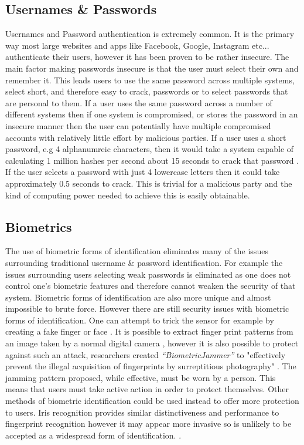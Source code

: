 \documentclass[12pt]{article}
\begin{document}
	\subsection{Usernames \& Passwords}
	Usernames and Password authentication is extremely common. It is the primary way most large websites and apps like Facebook, Google, Instagram etc... authenticate their users, however it has been proven to be rather insecure. The main factor making passwords insecure is that the user must select their own and remember it. This leads users to use the same password across multiple systems, select short, and therefore easy to crack, passwords or to select passwords that are personal to them.
	If a user uses the same password across a number of different systems then if one system is compromised, or stores the password in an insecure manner then the user can potentially have multiple compromised accounts with relatively little effort by malicious parties.
	If a user uses a short password, e.g 4 alphanumreic characters, then it would take a system capable of calculating 1 million hashes per second about 15 seconds to crack that password \citep{kessler1996passwords}. If the user selects a password with just 4 lowercase letters then it could take approximately 0.5 seconds to crack. This is trivial for a malicious party and the kind of computing power needed to achieve this is easily obtainable.
	\subsection{Biometrics}
	\label{subsect_biometrics}
	The use of biometric forms of identification eliminates many of the issues surrounding traditional username \& password identification. For example the issues surrounding users selecting weak passwords is eliminated as one does not control one's biometric features and therefore cannot weaken the security of that system. Biometric forms of identification are also more unique and almost impossible to brute force.
	However there are still security issues with biometric forms of identification. One can attempt to trick the sensor for example by creating a fake finger or face \citep{ambalakat2005security}. It is possible to extract finger print patterns from an image taken by a normal digital camera \citep{ogane2017biometric}, however it is also possible to protect against such an attack, researchers created \emph{``BiometricJammer''} to "effectively prevent the illegal acquisition of fingerprints by surreptitious photography" \citep{ogane2017biometric}. The jamming pattern proposed, while effective, must be worn by a person. This means that users must take active action in order to protect themselves. Other methods of biometric identification could be used instead to offer more protection to users.
	Iris recognition provides similar distinctiveness and performance to fingerprint recognition however it may appear more invasive so is unlikely to be accepted as a widespread form of identification. \citep{ambalakat2005security}.
\end{document}
